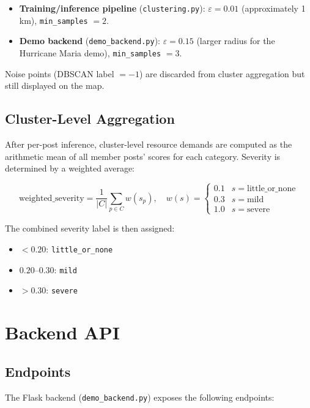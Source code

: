 \documentclass[11pt,a4paper]{article}
\begin{document}
\begin{itemize}
    \item \textbf{Training/inference pipeline} (\texttt{clustering.py}): $\varepsilon = 0.01$ (approximately 1\,km), \texttt{min\_samples} $= 2$.
    \item \textbf{Demo backend} (\texttt{demo\_backend.py}): $\varepsilon = 0.15$ (larger radius for the Hurricane Maria demo), \texttt{min\_samples} $= 3$.
\end{itemize}

Noise points (DBSCAN label $= -1$) are discarded from cluster aggregation but still displayed on the map.

\subsection{Cluster-Level Aggregation}

After per-post inference, cluster-level resource demands are computed as the arithmetic mean of all member posts' scores for each category. Severity is determined by a weighted average:

\[
\text{weighted\_severity} = \frac{1}{|C|} \sum_{p \in C} w(s_p), \quad
w(s) = \begin{cases}
0.1 & s = \text{little\_or\_none} \\
0.3 & s = \text{mild} \\
1.0 & s = \text{severe}
\end{cases}
\]

The combined severity label is then assigned:
\begin{itemize}
    \item $< 0.20$: \texttt{little\_or\_none}
    \item $0.20$--$0.30$: \texttt{mild}
    \item $> 0.30$: \texttt{severe}
\end{itemize}

\newpage
\section{Backend API}

\subsection{Endpoints}

The Flask backend (\texttt{demo\_backend.py}) exposes the following endpoints:
\end{document}
